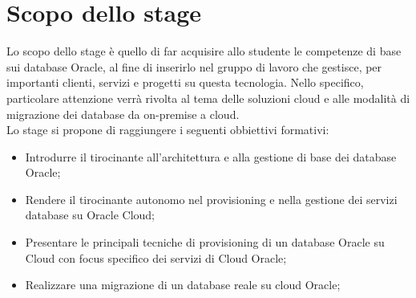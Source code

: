 \section*{Scopo dello stage}
Lo scopo dello stage è quello di far acquisire allo studente le competenze di base sui database Oracle, al fine di inserirlo nel gruppo di lavoro che gestisce, per importanti clienti, servizi e progetti su questa tecnologia. 
Nello specifico, particolare attenzione verrà rivolta al tema delle soluzioni cloud e alle modalità di migrazione dei database da on-premise a cloud. \\

Lo stage si propone di raggiungere i seguenti obbiettivi formativi:

\begin{itemize}
    \item Introdurre il tirocinante all'architettura e alla gestione di base dei database Oracle;
    \item Rendere il tirocinante autonomo nel provisioning e nella gestione dei servizi database su Oracle Cloud;
    \item Presentare le principali tecniche di provisioning di un database Oracle su Cloud con focus specifico dei servizi di Cloud Oracle;
    \item Realizzare una migrazione di un database reale su cloud Oracle;
\end{itemize}